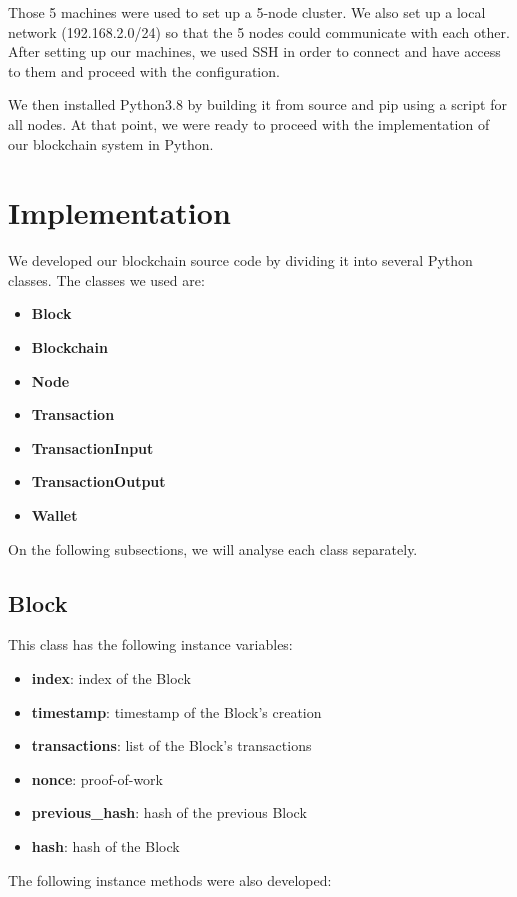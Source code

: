\documentclass[conference]{IEEEtran}
\begin{document}
Those 5 machines were used to set up a 5-node cluster. We also set up a local network (192.168.2.0/24) so that the 5 nodes could communicate with each other. After setting up our machines, we used SSH in order to connect and have access to them and proceed with the configuration.

We then installed Python3.8 \cite{b2} by building it from source and pip \cite{b3} using a script for all nodes. At that point, we were ready to proceed with the implementation of our blockchain system in Python.

\section{\textbf{Implementation}}
We developed our blockchain source code by dividing it into several Python classes. The classes we used are:

\begin{itemize}
\item \textbf{Block}
\item \textbf{Blockchain}
\item \textbf{Node}
\item \textbf{Transaction}
\item \textbf{TransactionInput}
\item \textbf{TransactionOutput}
\item \textbf{Wallet}
\end{itemize}

On the following subsections, we will analyse each class separately.

\subsection{Block}
This class has the following instance variables:

\begin{itemize}
\item \textbf{index}: index of the Block
\item \textbf{timestamp}: timestamp of the Block's creation
\item \textbf{transactions}: list of the Block's transactions
\item \textbf{nonce}: proof-of-work
\item \textbf{previous\_hash}: hash of the previous Block
\item \textbf{hash}: hash of the Block
\end{itemize}

The following instance methods were also developed:
\end{document}
